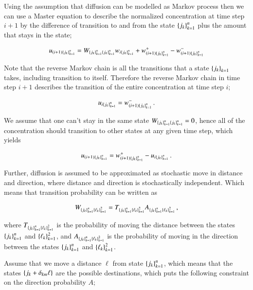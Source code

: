 \documentclass[11pt,english,a4paper]{article}
\begin{document}
\begin{flushleft}
Using the assumption that diffusion can be modelled as Markov process then we can use a Master equation to describe the normalized concentration at time step $i+1$ by the difference of transition to and from the state $\left\lbrace{j_k}\right\rbrace_{k=1}^n$ plus the amount that stays in the state; 

\begin{align}
u_{(i+1)\left\lbrace{j_k}\right\rbrace_{k=1}^n} = W_{\left\lbrace{j_k}\right\rbrace_{k=1}^n\left\lbrace{j_k}\right\rbrace_{k=1}^n} w_{i\left\lbrace{j_k}\right\rbrace_{k=1}^n} +  w_{(i+1)\left\lbrace{j_k}\right\rbrace_{k=1}^n}^+ - w_{(i+1)\left\lbrace{j_k}\right\rbrace_{k=1}^n}^-
\label{eq_39}
\end{align} 

Note that the reverse Markov chain is all the transitions that a state $\left\lbrace{j_k}\right\rbrace_{k=1}$ takes, including transition to itself. Therefore the reverse Markov chain in time step $i+1$ describes the transition of the entire concentration at time step $i$;

\begin{align*}
u_{i\left\lbrace{j_k}\right\rbrace_{k=1}^n} =  w_{(i+1)\left\lbrace{j_k}\right\rbrace_{k=1}^n}^- \,.
\end{align*}


We assume that one can't stay in the same state $W_{\left\lbrace{j_k}\right\rbrace_{k=1}^n\left\lbrace{j_k}\right\rbrace_{k=1}^n} = 0$, hence all of the concentration should transition to other states at any given time step, which yields

\begin{align}
u_{(i+1)\left\lbrace{j_k}\right\rbrace_{k=1}^n} = w_{(i+1)\left\lbrace{j_k}\right\rbrace_{k=1}^n}^+ - u_{i\left\lbrace{j_k}\right\rbrace_{k=1}^n} \,.
\label{eq_40}
\end{align}

Further, diffusion is assumed to be approximated as stochastic move in distance and direction, where distance and direction is stochastically independent. Which means that transition probability can be written as

\begin{align}
W_{\left\lbrace{j_k}\right\rbrace_{k=1}^n\left\lbrace{\ell_k}\right\rbrace_{k=1}^2} = T_{\left\lbrace{j_k}\right\rbrace_{k=1}^n\left\lbrace{\ell_k}\right\rbrace_{k=1}^2} A_{\left\lbrace{j_k}\right\rbrace_{k=1}^n\left\lbrace{\ell_k}\right\rbrace_{k=1}^2} \,,
\label{eq_41}
\end{align}

where $T_{\left\lbrace{j_k}\right\rbrace_{k=1}^n\left\lbrace{\ell_k}\right\rbrace_{k=1}^2}$ is the probability of moving the distance between the states $\left\lbrace{j_k}\right\rbrace_{k=1}^n$ and $\left\lbrace{\ell_k}\right\rbrace_{k=1}^2$, and $ A_{\left\lbrace{j_k}\right\rbrace_{k=1}^n\left\lbrace{\ell_k}\right\rbrace_{k=1}^2}$ is the probability of moving in the direction between the states $\left\lbrace{j_k}\right\rbrace_{k=1}^n$ and $\left\lbrace{\ell_k}\right\rbrace_{k=1}^2$. \linebreak

Assume that we move a distance $\ell$ from state $\left\lbrace{j_k}\right\rbrace_{k=1}^n$, which means that the states $\left\lbrace{j_k+\delta_{km}\ell}\right\rbrace$ are the possible destinations, which puts the following constraint on the direction probability $A$;


\end{flushleft}
\end{document}
